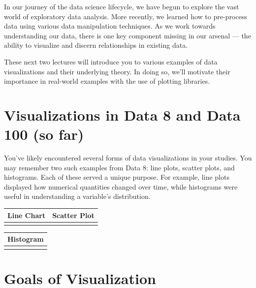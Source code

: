 \documentclass[
  letterpaper,
  DIV=11,
  numbers=noendperiod]{scrreprt}
\begin{document}
In our journey of the data science lifecycle, we have begun to explore
the vast world of exploratory data analysis. More recently, we learned
how to pre-process data using various data manipulation techniques. As
we work towards understanding our data, there is one key component
missing in our arsenal --- the ability to visualize and discern
relationships in existing data.

These next two lectures will introduce you to various examples of data
visualizations and their underlying theory. In doing so, we'll motivate
their importance in real-world examples with the use of plotting
libraries.

\section{Visualizations in Data 8 and Data 100 (so
far)}\label{visualizations-in-data-8-and-data-100-so-far}

You've likely encountered several forms of data visualizations in your
studies. You may remember two such examples from Data 8: line plots,
scatter plots, and histograms. Each of these served a unique purpose.
For example, line plots displayed how numerical quantities changed over
time, while histograms were useful in understanding a variable's
distribution.

\begin{longtable}[]{@{}
  >{\raggedright\arraybackslash}p{}
  >{\raggedright\arraybackslash}p{}@{}}
\toprule\noalign{}
\begin{minipage}[b]{\linewidth}\raggedright
Line Chart
\end{minipage} & \begin{minipage}[b]{\linewidth}\raggedright
Scatter Plot
\end{minipage} \\
\midrule\noalign{}
\endhead
\bottomrule\noalign{}
\endlastfoot
& \\
\end{longtable}

\begin{longtable}[]{@{}l@{}}
\toprule\noalign{}
Histogram \\
\midrule\noalign{}
\endhead
\bottomrule\noalign{}
\endlastfoot
 \\
\end{longtable}

\section{Goals of Visualization}\label{goals-of-visualization}
\end{document}
